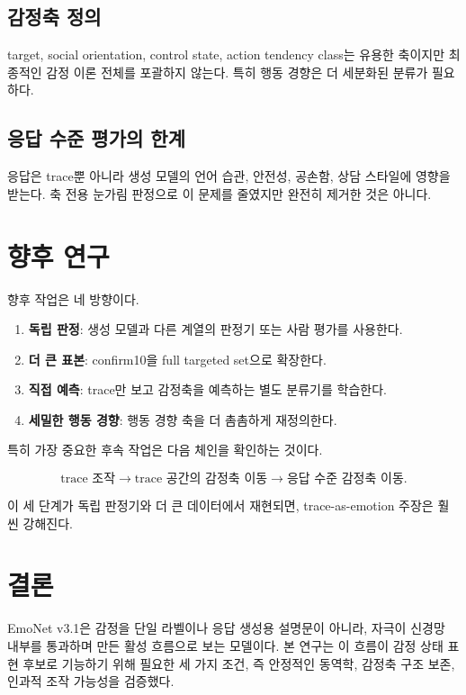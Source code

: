 \documentclass[11pt,a4paper]{article}
\begin{document}
\subsection{감정축 정의}

target, social orientation, control state, action tendency class는 유용한 축이지만 최종적인 감정 이론 전체를 포괄하지 않는다. 특히 행동 경향은 더 세분화된 분류가 필요하다.

\subsection{응답 수준 평가의 한계}

응답은 trace뿐 아니라 생성 모델의 언어 습관, 안전성, 공손함, 상담 스타일에 영향을 받는다. 축 전용 눈가림 판정으로 이 문제를 줄였지만 완전히 제거한 것은 아니다.

\section{향후 연구}

향후 작업은 네 방향이다.

\begin{enumerate}
  \item \textbf{독립 판정}: 생성 모델과 다른 계열의 판정기 또는 사람 평가를 사용한다.
  \item \textbf{더 큰 표본}: confirm10을 full targeted set으로 확장한다.
  \item \textbf{직접 예측}: trace만 보고 감정축을 예측하는 별도 분류기를 학습한다.
  \item \textbf{세밀한 행동 경향}: 행동 경향 축을 더 촘촘하게 재정의한다.
\end{enumerate}

특히 가장 중요한 후속 작업은 다음 체인을 확인하는 것이다.

\[
\text{trace 조작}
\rightarrow
\text{trace 공간의 감정축 이동}
\rightarrow
\text{응답 수준 감정축 이동}.
\]

이 세 단계가 독립 판정기와 더 큰 데이터에서 재현되면, trace-as-emotion 주장은 훨씬 강해진다.

\section{결론}

EmoNet v3.1은 감정을 단일 라벨이나 응답 생성용 설명문이 아니라, 자극이 신경망 내부를 통과하며 만든 활성 흐름으로 보는 모델이다. 본 연구는 이 흐름이 감정 상태 표현 후보로 기능하기 위해 필요한 세 가지 조건, 즉 안정적인 동역학, 감정축 구조 보존, 인과적 조작 가능성을 검증했다.
\end{document}
